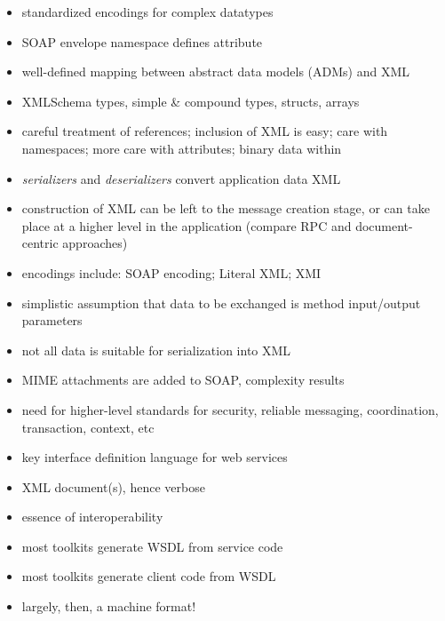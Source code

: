 \documentclass{sepslide-soa-faked} %
\begin{document}
\begin{slide}

	\begin{itemize}
	\item standardized encodings for complex datatypes
	\item SOAP envelope namespace defines 
		attribute
	\item well-defined mapping between abstract data models 
		(ADMs) and XML
	\item XMLSchema types, simple \& compound types, structs, arrays
	\item careful treatment of references;
 inclusion of XML is easy; care with namespaces; more care
		with  attributes;
 binary data within 
	\item \emph{serializers} and \emph{deserializers} convert 
		application data \maths{\leftrightarrow} XML
	\item construction of XML can be left to the message creation
		stage, or can take place at a higher level in the application
		(compare RPC and document-centric approaches)
	\item encodings include: SOAP encoding; Literal XML; XMI %
	\end{itemize}
\end{slide}

\begin{slide}

	\begin{itemize}
	\item simplistic assumption that data to be exchanged is method
	input/output parameters
	\item not all data is suitable for serialization into XML
	\item MIME attachments are added to SOAP, complexity results
	\item need for higher-level standards for security, reliable
	messaging, coordination, transaction, context, etc
	\end{itemize}
\end{slide}

\begin{slide}
	\begin{itemize}
	\item key interface definition language for web services
	\item XML document(s), hence verbose
	\item essence of interoperability
	\item most toolkits generate WSDL from service code 
	\item most toolkits generate client code from WSDL
	\item largely, then, a machine format!
	\end{itemize}
\end{slide}
\end{document}
